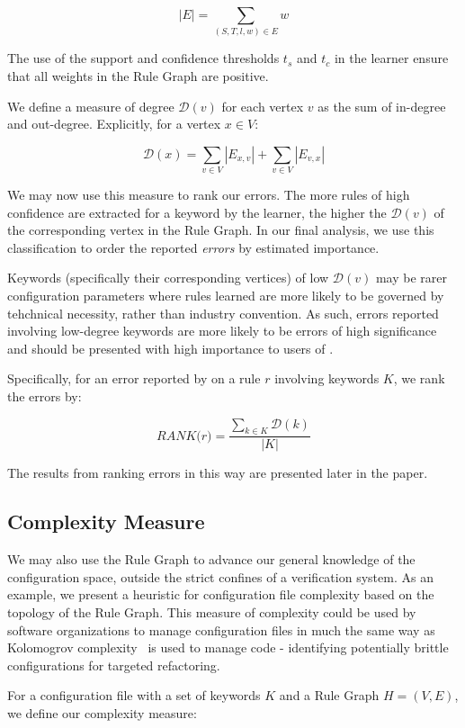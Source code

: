     $$|E| = \sum_{(S, T, l, w) \in E} w$$

The use of the support and confidence thresholds $t_s$ and $t_c$ in the learner ensure 
that all weights in the Rule Graph are positive.

We define a measure of degree $\mathcal{D}(v)$ for each vertex $v$ as the sum of 
in-degree and out-degree. Explicitly, for a vertex $x \in V$:

    $$\mathcal{D}(x) = \sum_{v \in V} |E_{x, v}| + \sum_{v \in V} |E_{v, x}|$$

We may now use this measure to rank our errors.
The more rules of high confidence are extracted for a keyword by the learner, 
the higher the $\mathcal{D}(v)$ of the corresponding vertex in the Rule Graph.
In our final analysis, we use this classification to
order the reported {\it errors} by estimated importance.

Keywords (specifically their corresponding vertices)
of low $\mathcal{D}(v)$ may be rarer configuration
parameters where rules learned are more likely to be governed by 
tehchnical necessity, rather than industry convention. As such, errors
reported involving low-degree keywords are more likely to be errors
of high significance and should be presented with high importance
to users of \app.

Specifically, for an error reported by \app on a rule $r$ involving
keywords $K$, we rank the errors by:

    $$\textit{RANK(r)} = \frac{\sum_{k \in K} \mathcal{D}(k)}{|K|}$$

The results from ranking errors in this way are presented later in
the paper.

\subsection{Complexity Measure}

We may also use the Rule Graph to advance our general knowledge
of the configuration space, outside the strict confines of a
verification system. As an example, we present a heuristic
for configuration file complexity based on the topology of the
Rule Graph. This measure of complexity could be used by software
organizations to manage configuration files in much the same way
as Kolomogrov complexity~\cite{kolmogorov1965} is used to manage code - identifying
potentially brittle configurations for targeted refactoring.

For a configuration file with a set of keywords $K$
and a Rule Graph $H = (V, E)$, we define our complexity measure:

